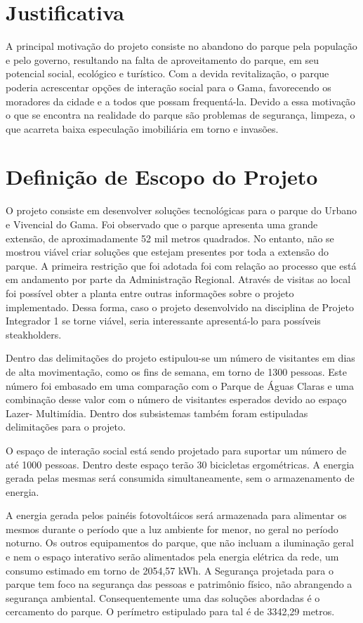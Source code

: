 \section{Justificativa}

A principal motiva\c{c}\~ao do projeto consiste no abandono do parque pela popula\c{c}\~ao e pelo governo, resultando na falta de aproveitamento do parque, em seu potencial social, ecológico e turístico. Com a devida revitaliza\c{c}\~ao, o parque poderia acrescentar op\c{c}\~oes de intera\c{c}\~ao social para o Gama, favorecendo os moradores da cidade e a todos que possam frequent\'a-la.
Devido a essa motiva\c{c}\~ao o que se encontra na realidade do parque s\~ao problemas de seguran\c{c}a, limpeza, o que acarreta baixa especula\c{c}\~ao imobili\'aria em torno e invas\~oes. 

\section{Definição de Escopo do Projeto}

	O projeto consiste em desenvolver soluções tecnológicas para o parque do Urbano e Vivencial do Gama. Foi observado que o parque apresenta uma grande extensão, de aproximadamente 52 mil metros quadrados. No entanto, não se mostrou viável criar soluções que estejam presentes por toda a extensão do parque. A primeira restrição que foi adotada foi com relação ao processo que está em andamento por parte da Administração Regional. Através de visitas ao local foi possível obter a planta entre outras informações sobre o projeto implementado. Dessa forma, caso o projeto desenvolvido na disciplina de Projeto Integrador 1 se torne viável, seria interessante apresentá-lo para possíveis steakholders. 

	Dentro das delimitações do projeto estipulou-se um número de visitantes em dias de alta movimentação, como os fins de semana, em torno de 1300 pessoas. Este número foi embasado em uma comparação com o Parque de Águas Claras e uma combinação desse valor com o número de visitantes esperados devido ao espaço Lazer- Multimídia. 
Dentro dos subsistemas também foram estipuladas delimitações para o projeto. 
	
	O espaço de interação social está sendo projetado para suportar um número de até 1000 pessoas. Dentro deste espaço terão 30 bicicletas ergométricas. A energia gerada pelas mesmas será consumida simultaneamente, sem o armazenamento de energia. 
	
	A energia gerada pelos painéis fotovoltáicos será armazenada para alimentar os mesmos durante o período que a luz ambiente for menor, no geral no período noturno. Os outros equipamentos do parque, que não incluam a iluminação geral e nem o espaço interativo serão alimentados pela energia elétrica da rede, um consumo estimado em torno de  2054,57 kWh. A Segurança projetada para o parque tem foco na segurança das pessoas e patrimônio físico, não abrangendo a segurança ambiental. Consequentemente uma das soluções abordadas é o cercamento do parque. O perímetro estipulado para tal é de 3342,29 metros. 

